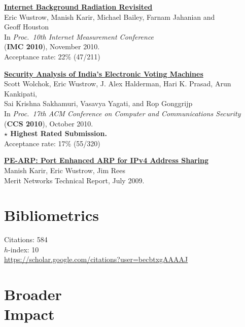 \documentclass[margin,11pt]{res} %
\begin{document}
    \textbf{\href{https://ericw.us/trow/imc10-wustrow.pdf}{Internet Background Radiation Revisited}} \\
        Eric Wustrow, Manish Karir, Michael Bailey, Farnam Jahanian and\\ Geoff Houston \\
        In \emph{Proc.\ 10th Internet Measurement Conference} \\
        (\textbf{IMC 2010}), November 2010.\\
        Acceptance rate: 22\% (47/211)

    \textbf{\href{http://www.cse.umich.edu/~jhalderm/pub/papers/evm-ccs10.pdf}{Security Analysis of India's Electronic Voting  Machines}} \\ 
        Scott Wolchok, Eric Wustrow, J. Alex Halderman, Hari K. Prasad, Arun Kankipati, \\
        Sai Krishna Sakhamuri, Vasavya Yagati, and Rop Gonggrijp \\
        In \emph{Proc.\ 17th ACM Conference on Computer and Communications Security} \\
        (\textbf{CCS 2010}), October 2010. \\
        \textbf{$\star$ Highest Rated Submission.} \\
        Acceptance rate: 17\% (55/320)

    \textbf{\href{https://ericw.us/trow/pe-arp.pdf}{PE-ARP: Port Enhanced ARP for IPv4 Address Sharing}} \\
        Manish Karir, Eric Wustrow, Jim Rees \\
        Merit Networks Technical Report, July 2009.        

\vspace{6pt}
\section{\large Bibliometrics}

Citations: 584\\
$h$-index: 10\\
\url{https://scholar.google.com/citations?user=becbtxgAAAAJ}
\fi


\vspace{6pt}
\section{\large Broader\\Impact}
\end{document}

